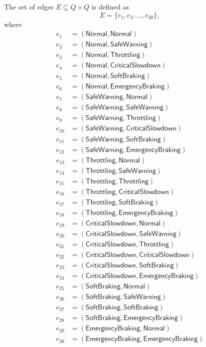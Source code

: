 \documentclass[12pt]{article}
\theoremstyle{definition}
\begin{document}
The set of edges $E \subseteq Q \times Q$ is defined as
\[
E = \{ e_1, e_2, \dots, e_{30} \},
\]
where
\[
\begin{aligned}
e_1 &= (\mathsf{Normal}, \mathsf{Normal}) \\
e_2 &= (\mathsf{Normal}, \mathsf{SafeWarning}) \\
e_3 &= (\mathsf{Normal}, \mathsf{Throttling}) \\
e_4 &= (\mathsf{Normal}, \mathsf{CriticalSlowdown}) \\
e_5 &= (\mathsf{Normal}, \mathsf{SoftBraking}) \\
e_6 &= (\mathsf{Normal}, \mathsf{EmergencyBraking}) \\
e_7 &= (\mathsf{SafeWarning}, \mathsf{Normal}) \\
e_8 &= (\mathsf{SafeWarning}, \mathsf{SafeWarning}) \\
e_9 &= (\mathsf{SafeWarning}, \mathsf{Throttling}) \\
e_{10} &= (\mathsf{SafeWarning}, \mathsf{CriticalSlowdown}) \\
e_{11} &= (\mathsf{SafeWarning}, \mathsf{SoftBraking}) \\
e_{12} &= (\mathsf{SafeWarning}, \mathsf{EmergencyBraking}) \\
e_{13} &= (\mathsf{Throttling}, \mathsf{Normal}) \\
e_{14} &= (\mathsf{Throttling}, \mathsf{SafeWarning}) \\
e_{15} &= (\mathsf{Throttling}, \mathsf{Throttling}) \\
e_{16} &= (\mathsf{Throttling}, \mathsf{CriticalSlowdown}) \\
e_{17} &= (\mathsf{Throttling}, \mathsf{SoftBraking}) \\
e_{18} &= (\mathsf{Throttling}, \mathsf{EmergencyBraking}) \\
e_{19} &= (\mathsf{CriticalSlowdown}, \mathsf{Normal}) \\
e_{20} &= (\mathsf{CriticalSlowdown}, \mathsf{SafeWarning}) \\
e_{21} &= (\mathsf{CriticalSlowdown}, \mathsf{Throttling}) \\
e_{22} &= (\mathsf{CriticalSlowdown}, \mathsf{CriticalSlowdown}) \\
e_{23} &= (\mathsf{CriticalSlowdown}, \mathsf{SoftBraking}) \\
e_{24} &= (\mathsf{CriticalSlowdown}, \mathsf{EmergencyBraking}) \\
e_{25} &= (\mathsf{SoftBraking}, \mathsf{Normal}) \\
e_{26} &= (\mathsf{SoftBraking}, \mathsf{SafeWarning}) \\
e_{27} &= (\mathsf{SoftBraking}, \mathsf{SoftBraking}) \\
e_{28} &= (\mathsf{SoftBraking}, \mathsf{EmergencyBraking}) \\
e_{29} &= (\mathsf{EmergencyBraking}, \mathsf{Normal}) \\
e_{30} &= (\mathsf{EmergencyBraking}, \mathsf{EmergencyBraking})
\end{aligned}
\]
\end{document}

